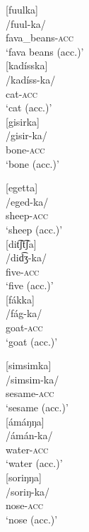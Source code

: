 \documentclass[output=paper]{langscibook}
\begin{document}
\ea \label{accnoass}
\begin{multicols}{3}
\ea {}[fuulka]\\
/fuul-ka/\\
fava\_beans-\textsc{acc}\\
`fava beans (acc.)'\\
\ex {}[kad\'isska]\\
/kad\'iss-ka/\\
cat-\textsc{acc}\\
`cat (acc.)'\\
\ex {}[gisirka]\\
/gisir-ka/\\
bone-\textsc{acc}\\
`bone (acc.)'\\
\z
\end{multicols}

\ex \label{accass}
\begin{multicols}{3}
\ea {}[egetta]\\ \label{egetta}
/eged-ka/\\
sheep-\textsc{acc}\\
`sheep (acc.)'\\
\ex {}[dit͡ʃt͡ʃa]\\ \label{ditstsa}
/di\t{dʒ}-ka/\\
five-\textsc{acc}\\
`five (acc.)'\\
\ex {}[fákka]\\ \label{fakka}
/fág-ka/\\
goat-\textsc{acc}\\
`goat (acc.)'\\
\z
\end{multicols}
\ex \label{accnas}

\begin{multicols}{3}
\ea {}[simsimka]\\ \label{simsimka}
/simsim-ka/\\
sesame-\textsc{acc}\\
`sesame (acc.)'\\
\ex {}[ámáŋŋa]\\ \label{amanga}
/ámán-ka/\\
water-\textsc{acc}\\
`water (acc.)'\\
\ex {}[soriŋŋa]\\ \label{soringa}
/soriŋ-ka/\\
nose-\textsc{acc}\\
`nose (acc.)'\\
\z
\end{multicols}
\z
\end{document}
